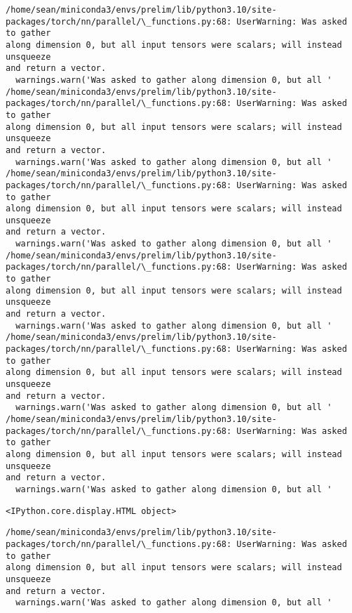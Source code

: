 \documentclass[11pt]{article}
\begin{document}
    
    \begin{Verbatim}[commandchars=\\\{\}]
/home/sean/miniconda3/envs/prelim/lib/python3.10/site-
packages/torch/nn/parallel/\_functions.py:68: UserWarning: Was asked to gather
along dimension 0, but all input tensors were scalars; will instead unsqueeze
and return a vector.
  warnings.warn('Was asked to gather along dimension 0, but all '
/home/sean/miniconda3/envs/prelim/lib/python3.10/site-
packages/torch/nn/parallel/\_functions.py:68: UserWarning: Was asked to gather
along dimension 0, but all input tensors were scalars; will instead unsqueeze
and return a vector.
  warnings.warn('Was asked to gather along dimension 0, but all '
/home/sean/miniconda3/envs/prelim/lib/python3.10/site-
packages/torch/nn/parallel/\_functions.py:68: UserWarning: Was asked to gather
along dimension 0, but all input tensors were scalars; will instead unsqueeze
and return a vector.
  warnings.warn('Was asked to gather along dimension 0, but all '
/home/sean/miniconda3/envs/prelim/lib/python3.10/site-
packages/torch/nn/parallel/\_functions.py:68: UserWarning: Was asked to gather
along dimension 0, but all input tensors were scalars; will instead unsqueeze
and return a vector.
  warnings.warn('Was asked to gather along dimension 0, but all '
/home/sean/miniconda3/envs/prelim/lib/python3.10/site-
packages/torch/nn/parallel/\_functions.py:68: UserWarning: Was asked to gather
along dimension 0, but all input tensors were scalars; will instead unsqueeze
and return a vector.
  warnings.warn('Was asked to gather along dimension 0, but all '
/home/sean/miniconda3/envs/prelim/lib/python3.10/site-
packages/torch/nn/parallel/\_functions.py:68: UserWarning: Was asked to gather
along dimension 0, but all input tensors were scalars; will instead unsqueeze
and return a vector.
  warnings.warn('Was asked to gather along dimension 0, but all '
    \end{Verbatim}

    
    \begin{Verbatim}[commandchars=\\\{\}]
<IPython.core.display.HTML object>
    \end{Verbatim}

    
    \begin{Verbatim}[commandchars=\\\{\}]
/home/sean/miniconda3/envs/prelim/lib/python3.10/site-
packages/torch/nn/parallel/\_functions.py:68: UserWarning: Was asked to gather
along dimension 0, but all input tensors were scalars; will instead unsqueeze
and return a vector.
  warnings.warn('Was asked to gather along dimension 0, but all '
    \end{Verbatim}
\end{document}
